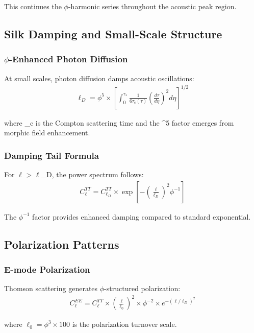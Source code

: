 This continues the $\phi$-harmonic series throughout the acoustic peak region.

\subsection{Silk Damping and Small-Scale Structure}

\subsubsection{$\phi$-Enhanced Photon Diffusion}

At small scales, photon diffusion damps acoustic oscillations:
\begin{align}
\ell_D = \phi^5 \times \left[\int_0^{\tau_*} \frac{1}{6\tau_c(\tau)} \left(\frac{d\tau}{d\eta}\right)^2 d\eta\right]^{1/2}
\end{align}

where \tau_c is the Compton scattering time and the \phi^5 factor emerges from morphic field enhancement.

\subsubsection{Damping Tail Formula}

For $\ell$ > $\ell$_D, the power spectrum follows:
\begin{align}
C_\ell^{TT} = C_{\ell_D}^{TT} \times \exp\left[-\left(\frac{\ell}{\ell_D}\right)^2 \phi^{-1}\right]
\end{align}

The $\phi^{-1}$ factor provides enhanced damping compared to standard exponential.

\subsection{Polarization Patterns}

\subsubsection{E-mode Polarization}

Thomson scattering generates $\phi$-structured polarization:
\begin{align}
C_\ell^{EE} = C_\ell^{TT} \times \left(\frac{\ell}{\ell_0}\right)^2 \times \phi^{-2} \times e^{-(\ell/\ell_D)^2}
\end{align}

where $\ell_0 = \phi^3 \times 100$ is the polarization turnover scale.


